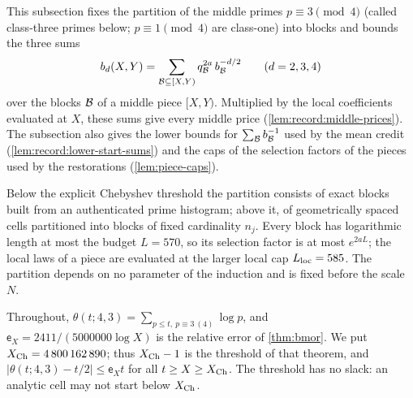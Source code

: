 This subsection fixes the partition of the middle primes $p\equiv3\pmod4$
(called class-three primes below; $p\equiv1\pmod4$ are class-one) into
blocks and bounds the three sums
\[
 b_d(X,Y)=\sum_{\mathcal B\subseteq[X,Y)}q_{\mathcal B}^{2a}\,b_{\mathcal B}^{-d/2}
 \qquad(d=2,3,4)
\]
over the blocks $\mathcal B$ of a middle piece $[X,Y)$. Multiplied by the local
coefficients evaluated at $X$, these sums give every middle price
(\cref{lem:record:middle-prices}). The subsection also gives the lower
bounds for $\sum_{\mathcal B}b_{\mathcal B}^{-1}$ used by the mean credit
(\cref{lem:record:lower-start-sums}) and the caps of the selection factors of
the pieces used by the restorations (\cref{lem:piece-caps}).

Below the explicit Chebyshev threshold the partition consists of exact
blocks built from an authenticated prime histogram; above it, of
geometrically spaced cells partitioned into blocks of fixed cardinality $n_j$. Every block has logarithmic length at most the
budget $L=570$, so its selection factor is at most $e^{2aL}$; the local laws
of a piece are evaluated at the larger local cap $L_{\rm loc}=585$. The
partition depends on no parameter of the induction and is fixed before the
scale $N$.

Throughout, $\theta(t;4,3)=\sum_{p\le t,\ p\equiv3\ (4)}\log p$, and
$\mathsf e_X=2411/(5000000\log X)$ is the relative error of \cref{thm:bmor}.
We put $X_{\rm Ch}=4\,800\,162\,890$; thus $X_{\rm Ch}-1$ is the threshold of
that theorem, and $|\theta(t;4,3)-t/2|\le\mathsf e_Xt$ for all
$t\ge X\ge X_{\rm Ch}$. The threshold has no slack: an analytic cell may not
start below $X_{\rm Ch}$.

